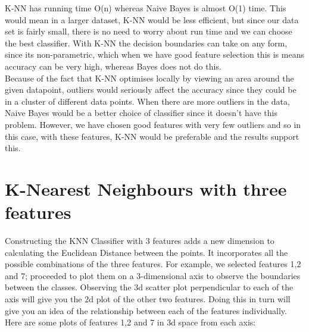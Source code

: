 \documentclass[10pt]{article}
\begin{document}
\noindent
K-NN has running time O(n) whereas Naive Bayes is almost O(1) time. This would mean in a larger dataset, K-NN would be less efficient, but since our data set is fairly small, there is no need to worry about run time and we can choose the best classifier.
With K-NN the decision boundaries can take on any form, since its non-parametric, which when we have good feature selection this is means accuracy can be very high, whereas Bayes does not do this.\\

\noindent
Because of the fact that K-NN optimises locally by viewing an area around the given datapoint, outliers would seriously affect the accuracy since they could be in a cluster of different data points. When there are more outliers in the data, Naive Bayes would be a better choice of classifier since it doesn't have this problem. However, we have chosen good features with very few outliers and so in this case, with these features, K-NN would be preferable and the results support this.
\\
\section*{K-Nearest Neighbours with three features}

Constructing the KNN Classifier with 3 features adds a new dimension to calculating the Euclidean Distance between the points. It incorporates all the possible combinations of the three features. For example, we selected features 1,2 and 7; proceeded to plot them on a 3-dimensional axis to observe the boundaries between the classes. Observing the 3d scatter plot perpendicular to each of the axis will give you the 2d plot of the other two features. Doing this in turn will give you an idea of the relationship between each of the features individually. \\

\noindent
Here are some plots of features 1,2 and 7 in 3d space from each axis:
\end{document}
